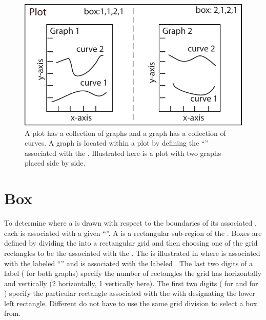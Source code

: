 {{%

\begin{figure}[bt]
  \centering
  \includegraphics[width=5.0in]{plot-plot.pdf}
  \caption[Plotting nomenclature.]
  {
A plot has a collection of graphs and a graph has a collection of curves. A graph is located within
a plot by defining the ``'' associated with the . Illustrated here is a plot with
two graphs placed side by side.
  }
  \label{f:plot.plot}
\end{figure}

\section{Box}
\label{s:box.def}

To determine where a  is drawn with respect to the boundaries of its associated ,
each  is associated with a given ``''. A  is a rectangular sub-region of
the . Boxes are defined by dividing the  into a rectangular grid and then choosing
one of the grid rectangles to be the  associated with the . The is illustrated in
 where  is associated with the  labeled ``'' and
 is associated with the  labeled .  The last two digits of a
 label ( for both graphs) specify the number of rectangles the grid has horizontally
and vertically (2 horizontally, 1 vertically here). The first two digits ( for 
and  for ) specify the particular rectangle associated with the  with
 designating the lower left rectangle. Different  do not have to use the same
grid division to select a box from.

}}
